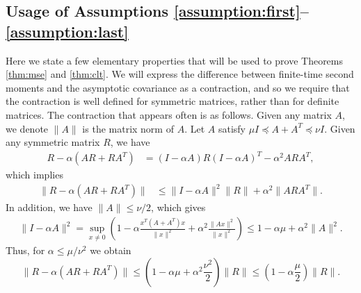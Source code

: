 \subsection{Usage of Assumptions \ref{assumption:first}--\ref{assumption:last}}\label{sec:recursion}
Here we state a few elementary properties that will be used to prove Theorems \ref{thm:mse} and \ref{thm:clt}.
We will express the difference between finite-time second moments and the asymptotic covariance as a contraction, and so we require that the contraction is well defined for symmetric matrices, rather than for definite matrices.  
The contraction that appears often is as follows. Given any matrix $A$, we denote $\|A\|$ is the matrix norm of $A$. Let $A$ satisfy $\mu I \preceq A + A^T \preceq \nu I$. Given any symmetric matrix $R$, we have
\begin{align*}
    R - \alpha (A R + R A^T)
    &= (I - \alpha A) R (I - \alpha A)^T - \alpha^2 A R A^T,
\end{align*}
which implies 
\begin{align*}
    \lVert R - \alpha (A R + R A^T) \rVert &\leq \lVert I - \alpha A \rVert^2 \lVert R \rVert + \alpha^2 \lVert A R A^T \rVert.
\end{align*}
In addition, we have $\lVert A \rVert \leq \nu / 2$, which gives
\begin{align*}
    \lVert I - \alpha A \rVert^2 = \sup_{x \neq 0} \left(1 - \alpha \frac{x^T (A + A^T) x}{\lVert x \rVert^2} + \alpha^2 \frac{\lVert A x \rVert^2}{\lVert x \rVert^2}\right) 
    \leq 1 - \alpha \mu + \alpha^2 \lVert A \rVert^2.
\end{align*}
Thus, for $\alpha \leq \mu/\nu^2$ we obtain
\begin{equation}\label{eq:contraction}
    \lVert R - \alpha (A R + R A^T) \rVert 
    \leq 
    \left(1 - \alpha \mu + \alpha^2 \frac{\nu^2}{2}\right) \lVert R \rVert 
    \leq \left(1 - \alpha \frac{\mu}{2}\right)\lVert R \rVert     .
\end{equation}


